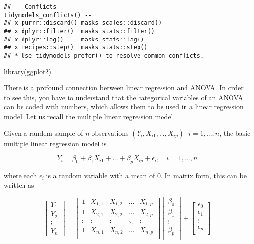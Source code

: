\documentclass[
]{book}
\newenvironment{Shaded}{\begin{snugshade}}{\end{snugshade}}
\newcommand{\FunctionTok}[1]{\textcolor[rgb]{0.00,0.00,0.00}{#1}}
\newcommand{\NormalTok}[1]{#1}
\begin{document}
\begin{verbatim}
## -- Conflicts ----------------------------------------- tidymodels_conflicts() --
## x purrr::discard() masks scales::discard()
## x dplyr::filter()  masks stats::filter()
## x dplyr::lag()     masks stats::lag()
## x recipes::step()  masks stats::step()
## * Use tidymodels_prefer() to resolve common conflicts.
\end{verbatim}

\begin{Shaded}
\begin{Highlighting}[]
\FunctionTok{library}\NormalTok{(ggplot2)}
\end{Highlighting}
\end{Shaded}

There is a profound connection between linear regression and ANOVA. In
order to see this, you have to understand that the categorical variables
of an ANOVA can be coded with numbers, which allows them to be used in a
linear regression model. Let us recall \autocite{LinearMod} the multiple linear
regression model.

Given a random sample of \(n\) observations
\((Y_{i}, X_{i1}, . . ., X_{ip}),\ i=1,...,n\), the basic multiple linear regression model is

\[
Y_{i}=\beta_0+\beta_1X_{i1}+...+\beta_pX_{ip}+\epsilon_i,\quad i=1,...,n
\]

where each \(\epsilon_i\) is a random variable with a mean of \(0\). In
matrix form, this can be written as

\[
\begin{bmatrix}
Y_1\\
Y_2\\
\vdots\\
Y_n
\end{bmatrix}
= 
\begin{bmatrix}
1 & X_{1,1} & X_{1,2} & \dots & X_{1, p}\\
1 & X_{2,1} & X_{2,2} & \dots & X_{2, p}\\
\vdots & \vdots & \vdots & \ddots & \vdots\\
1 & X_{n,1} & X_{n,2} & \dots & X_{n, p}\\
\end{bmatrix}
\begin{bmatrix}
\beta_0\\
\beta_1\\
\vdots\\
\beta_p\\
\end{bmatrix}
+
\begin{bmatrix}
\epsilon_0\\
\epsilon_1\\
\vdots\\
\epsilon_n\\
\end{bmatrix}
\]
\end{document}
